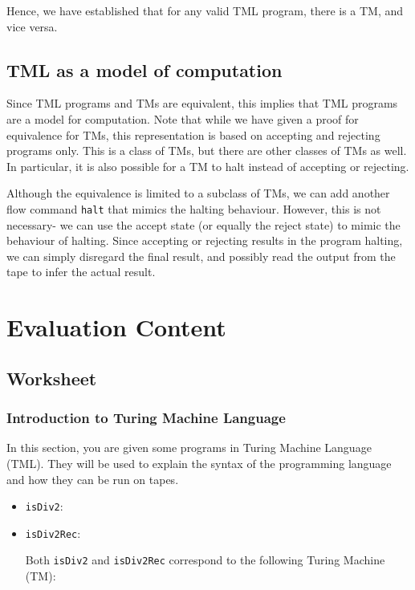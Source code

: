 \begin{appendices}
Hence, we have established that for any valid TML program, there is a TM, and vice versa.

\section{TML as a model of computation}
Since TML programs and TMs are equivalent, this implies that TML programs are a model for computation. Note that while we have given a proof for equivalence for TMs, this representation is based on accepting and rejecting programs only. This is a class of TMs, but there are other classes of TMs as well. In particular, it is also possible for a TM to halt instead of accepting or rejecting.

Although the equivalence is limited to a subclass of TMs, we can add another flow command \texttt{halt} that mimics the halting behaviour. However, this is not necessary- we can use the accept state (or equally the reject state) to mimic the behaviour of halting. Since accepting or rejecting results in the program halting, we can simply disregard the final result, and possibly read the output from the tape to infer the actual result.

\chapter{Evaluation Content}
\section{Worksheet}
\subsection{Introduction to Turing Machine Language}
In this section, you are given some programs in Turing Machine Language (TML). They will be used to explain the syntax of the programming language and how they can be run on tapes.
\begin{itemize}
    \item \texttt{isDiv2}:
    
    
    \item \texttt{isDiv2Rec}:
    

    \noindent Both \texttt{isDiv2} and \texttt{isDiv2Rec} correspond to the following Turing Machine (TM):
    \begin{figure}[H]
        \centering
\end{figure}
\end{itemize}
\end{appendices}
